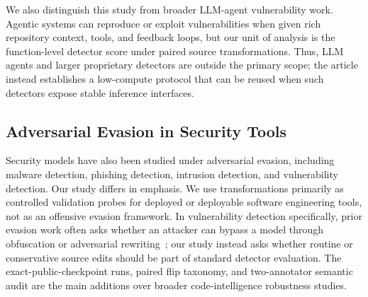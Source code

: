 \documentclass[a4paper,fleqn]{cas-dc}
\begin{document}
\begin{table}[t]
  \centering
  \caption{Positioning against closely related robustness work for code models.}
  \label{tab:related-positioning}
\end{table}

We also distinguish this study from broader LLM-agent vulnerability work.
Agentic systems can reproduce or exploit vulnerabilities when given rich
repository context, tools, and feedback loops, but our unit of analysis is the
function-level detector score under paired source transformations. Thus, LLM
agents and larger proprietary detectors are outside the primary scope; the
article instead establishes a low-compute protocol that can be reused when such
detectors expose stable inference interfaces.

\subsection{Adversarial Evasion in Security Tools}

Security models have also been studied under adversarial evasion, including
malware detection, phishing detection, intrusion detection, and vulnerability
detection. Our study differs in emphasis. We use transformations primarily as
controlled validation probes for deployed or deployable software engineering
tools, not as an offensive evasion framework. In vulnerability detection
specifically, prior evasion work often asks whether an attacker can bypass a
model through obfuscation or adversarial rewriting~\cite{sun2026syntax}; our
study instead asks whether routine or conservative source edits should be part
of standard detector evaluation. The exact-public-checkpoint runs, paired flip
taxonomy, and two-annotator semantic audit are the main additions over broader
code-intelligence robustness studies.
\end{document}
